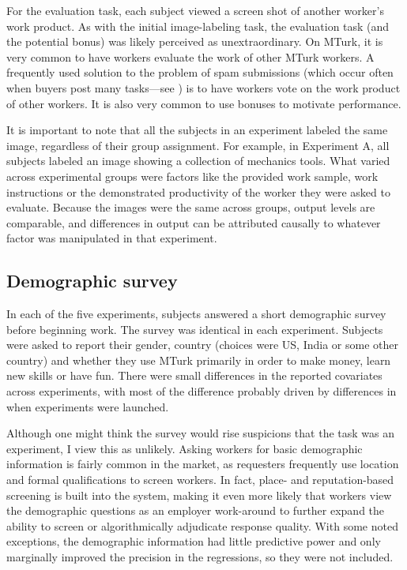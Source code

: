 \documentclass[12pt]{article}
\begin{document}
For the evaluation task, each subject viewed a screen shot of another
worker's work product. As with the initial image-labeling task, the
evaluation task (and the potential bonus) was likely perceived as
unextraordinary. On MTurk, it is very common to have workers evaluate
the work of other MTurk workers. A frequently used solution to the
problem of spam submissions (which occur often when buyers post many
tasks---see \cite{ipeirotis2010quality}) is to have workers vote on
the work product of other workers. It is also very common to use
bonuses to motivate performance.

It is important to note that all the subjects in an experiment labeled
the same image, regardless of their group assignment. For example, in
Experiment A, all subjects labeled an image showing a collection of
mechanics tools. What varied across experimental groups were factors
like the provided work sample, work instructions or the demonstrated
productivity of the worker they were asked to evaluate. Because the
images were the same across groups, output levels are comparable, and
differences in output can be attributed causally to whatever factor
was manipulated in that experiment.

\subsection{Demographic survey}
In each of the five experiments, subjects answered a short demographic
survey before beginning work. The survey was identical in each
experiment. Subjects were asked to report their gender, country
(choices were US, India or some other country) and whether they use
MTurk primarily in order to make money, learn new skills or have
fun. There were small differences in the reported covariates across
experiments, with most of the difference probably driven by
differences in when experiments were launched. 

Although one might think the survey would rise suspicions that the
task was an experiment, I view this as unlikely. Asking workers for basic
demographic information is fairly common in the market, as requesters
frequently use location and formal qualifications to screen workers. In
fact, place- and reputation-based screening is built into the system,
making it even more likely that workers view the demographic questions
as an employer work-around to further expand the ability to screen or
algorithmically adjudicate response quality. With some noted
exceptions, the demographic information had little predictive power
and only marginally improved the precision in the regressions, so they
were not included.
\end{document}
